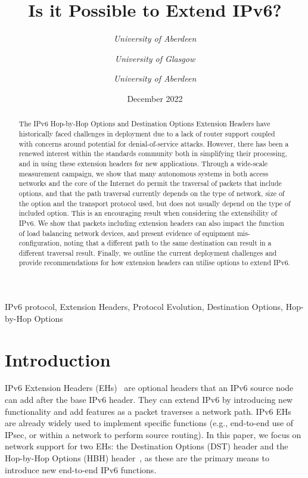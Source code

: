 \documentclass[conference]{IEEEtran}
\title{Is it Possible to Extend IPv6?}
\date{December 2022}
\author{\IEEEauthorblockN{Ana Custura}
\IEEEauthorblockA{
\textit{University of Aberdeen}\\
}
\and
\IEEEauthorblockN{Raffaello Secchi}
\textit{University of Aberdeen}\\
\and
\IEEEauthorblockN{Elizabeth Boswell}
\textit{University of Glasgow}\\
\and
\IEEEauthorblockN{Gorry Fairhurst}
\textit{University of Aberdeen}\\
}
\begin{document}
\maketitle

\begin{abstract}
The IPv6 Hop-by-Hop Options and Destination Options Extension Headers have historically faced challenges in deployment due to a lack of router support coupled with concerns around potential for denial-of-service attacks. However, there has been a renewed interest within the standards community both in simplifying their processing, and in using these extension headers for new applications. 
Through a wide-scale measurement campaign, we show that many autonomous systems in both access networks and the core of the Internet do permit the traversal of packets that include options, and that the path traversal currently depends on the type of network, size of the option and the transport protocol used, but does not usually depend on the type of included option. This is an encouraging result when considering the extensibility of IPv6. We show that packets including extension headers can also impact the function of load balancing network devices, and present evidence of equipment mis-configuration, noting that a different path to the same destination can result in a different traversal result. Finally, we outline the current deployment challenges and provide recommendations for how extension headers can utilise options to extend IPv6.

\end{abstract}

\begin{IEEEkeywords}
IPv6 protocol, Extension Headers, Protocol Evolution, Destination Options, Hop-by-Hop Options
\end{IEEEkeywords}

\section{Introduction}
\label{sec:introduction}

IPv6 Extension Headers (EHs)~\cite{rfc8200} are optional headers that an IPv6 source node can add after the base IPv6 header. They can extend IPv6 by introducing new functionality and add features as a packet traverses a network path.  
IPv6 EHs are already widely used to implement specific functions (e.g., end-to-end use of IPsec, or within a network to perform source routing).
In this paper, we focus on network support for two EHs: the Destination Options (DST) header and the Hop-by-Hop Options (HBH) header~\cite{rfc9098}, as these are the primary means to introduce new end-to-end IPv6 functions.
\end{document}
